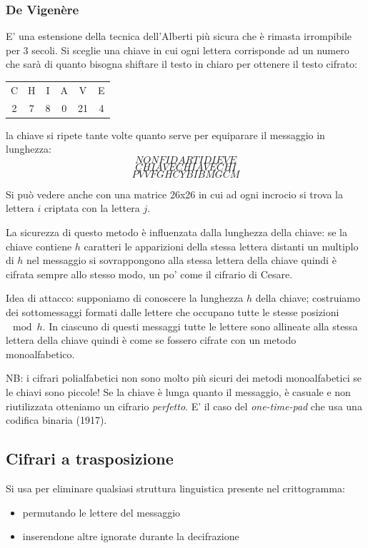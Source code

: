 \subsubsection{De Vigenère}
E' una estensione della tecnica dell'Alberti più sicura che è rimasta irrompibile per 3 secoli. Si sceglie una chiave in cui ogni lettera corrisponde ad un numero che sarà di quanto bisogna shiftare il testo in chiaro per ottenere il testo cifrato:
\begin{table}[ht!]
    \centering
    \begin{tabular}{c c c c c c}
        C & H & I & A & V & E \\
        2 & 7 & 8 & 0 & 21 & 4
    \end{tabular}
\end{table}
la chiave si ripete tante volte quanto serve per equiparare il messaggio in lunghezza:
$$ NONFIDARTIDIEVE $$
$$ CHIAVECHIAVECHI $$
$$ PVVFGHCYBIBMGCM $$

Si può vedere anche con una matrice 26x26 in cui ad ogni incrocio si trova la lettera $i$ criptata con la lettera $j$.

La sicurezza di questo metodo è influenzata dalla lunghezza della chiave: se la chiave contiene $h$ caratteri le apparizioni della stessa lettera distanti un multiplo di $h$ nel messaggio si sovrappongono alla stessa lettera della chiave quindi è cifrata sempre allo stesso modo, un po' come il cifrario di Cesare.

Idea di attacco: supponiamo di conoscere la lunghezza $h$ della chiave; costruiamo dei sottomessaggi formati dalle lettere che occupano tutte le stesse posizioni $\mod h$. In ciascuno di questi messaggi tutte le lettere sono allineate alla stessa lettera della chiave quindi è come se fossero cifrate con un metodo monoalfabetico.

NB: i cifrari polialfabetici non sono molto più sicuri dei metodi monoalfabetici se le chiavi sono piccole! Se la chiave è lunga quanto il messaggio, è casuale e non riutilizzata otteniamo un cifrario \emph{perfetto}. E' il caso del \emph{one-time-pad} che usa una codifica binaria (1917).

\subsection{Cifrari a trasposizione}
Si usa per eliminare qualsiasi struttura linguistica presente nel crittogramma:
\begin{itemize}
    \item permutando le lettere del messaggio
    \item inserendone altre ignorate durante la decifrazione
\end{itemize}

